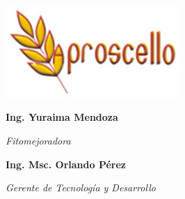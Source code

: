 \documentclass[
  letterpaper,
  DIV=11,
  numbers=noendperiod]{scrartcl}
\begin{document}
\begin{figure}

\begin{minipage}{0.50\linewidth}

\includegraphics[width=2.60417in,height=\textheight]{logo.png}

\end{minipage}%
%
\begin{minipage}{0.50\linewidth}

\textbf{Ing. Yuraima Mendoza}

\emph{Fitomejoradora}

\textbf{Ing. Msc. Orlando Pérez}

\emph{Gerente de Tecnología y Desarrollo}

\end{minipage}%

\end{figure}%
\end{document}
